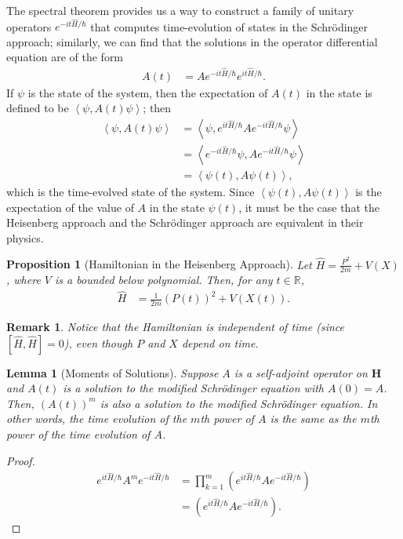 \documentclass[12pt]{extarticle}
\newtheorem*{remark}{Remark}
\newcommand{\R}{\mathbb{R}}
\newcommand{\iprod}[2]{\left\langle #1,#2\right\rangle}
\theoremstyle{plain}
\newtheorem*{lemma}{Lemma}%
\newtheorem*{proposition}{Proposition}%
\theoremstyle{definition}
\theoremstyle{remark}
\begin{document}
  The spectral theorem provides us a way to construct a family of unitary operators $e^{-it\hat{H}/\hbar}$ that computes time-evolution of states in the Schrödinger approach; similarly, we can find that the solutions in the operator differential equation are of the form
  \begin{align*}
    A(t) &= Ae^{-it\hat{H}/\hbar}e^{it\hat{H}/\hbar}.
  \end{align*}
  If $\psi$ is the state of the system, then the expectation of $A(t)$ in the state is defined to be $\iprod{\psi}{A(t)\psi}$; then
  \begin{align*}
    \iprod{\psi}{A(t)\psi} &= \iprod{\psi}{e^{it\hat{H}/\hbar}Ae^{-it\hat{H}/\hbar}\psi}\\
                           &= \iprod{e^{-it\hat{H}/\hbar}\psi}{Ae^{-it\hat{H}/\hbar}\psi}\\
                           &= \iprod{\psi(t)}{A\psi(t)},
  \end{align*}
  which is the time-evolved state of the system. Since $\iprod{\psi(t)}{A\psi(t)}$ is the expectation of the value of $A$ in the state $\psi(t)$, it must be the case that the Heisenberg approach and the Schrödinger approach are equivalent in their physics.
  \begin{proposition}[Hamiltonian in the Heisenberg Approach]
    Let $\hat{H} = \frac{P^2}{2m} + V(X)$, where $V$ is a bounded below polynomial. Then, for any $t\in \R$,
    \begin{align*}
      \hat{H} &= \frac{1}{2m}\left(P(t)\right)^2 + V(X(t)).
    \end{align*}
  \end{proposition}
  \begin{remark}
    Notice that the Hamiltonian is independent of time (since $[\hat{H},\hat{H}] = 0$), even though $P$ and $X$ depend on time.
  \end{remark}
  \begin{lemma}[Moments of Solutions]
    Suppose $A$ is a self-adjoint operator on $\mathbf{H}$ and $A(t)$ is a solution to the modified Schrödinger equation with $A(0) = A$. Then, $\left(A(t)\right)^m$ is also a solution to the modified Schrödinger equation. In other words, the time evolution of the $m$th power of $A$ is the same as the $m$th power of the time evolution of $A$.
  \end{lemma}
  \begin{proof}
    \begin{align*}
      e^{it\hat{H}/\hbar}A^{m}e^{-it\hat{H}/\hbar} &= \prod_{k=1}^{m}\left(e^{it\hat{H}/\hbar}Ae^{-it\hat{H}/\hbar}\right)\\
                                                   &= \left(e^{it\hat{H}/\hbar}Ae^{-it\hat{H}/\hbar}\right).
    \end{align*}
  \end{proof}
\end{document}
